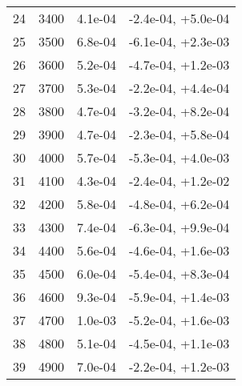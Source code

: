 \begin{table}
\begin{adjustbox}{width=1\textwidth/2}
\begin{tabular}{|c|c|c|c|}
\cline{1-4}
24 & 3400 & 4.1e-04 & -2.4e-04, +5.0e-04 \\
\cline{1-4}
25 & 3500 & 6.8e-04 & -6.1e-04, +2.3e-03 \\
\cline{1-4}
26 & 3600 & 5.2e-04 & -4.7e-04, +1.2e-03 \\
\cline{1-4}
27 & 3700 & 5.3e-04 & -2.2e-04, +4.4e-04 \\
\cline{1-4}
28 & 3800 & 4.7e-04 & -3.2e-04, +8.2e-04 \\
\cline{1-4}
29 & 3900 & 4.7e-04 & -2.3e-04, +5.8e-04 \\
\cline{1-4}
30 & 4000 & 5.7e-04 & -5.3e-04, +4.0e-03 \\
\cline{1-4}
31 & 4100 & 4.3e-04 & -2.4e-04, +1.2e-02 \\
\cline{1-4}
32 & 4200 & 5.8e-04 & -4.8e-04, +6.2e-04 \\
\cline{1-4}
33 & 4300 & 7.4e-04 & -6.3e-04, +9.9e-04 \\
\cline{1-4}
34 & 4400 & 5.6e-04 & -4.6e-04, +1.6e-03 \\
\cline{1-4}
35 & 4500 & 6.0e-04 & -5.4e-04, +8.3e-04 \\
\cline{1-4}
36 & 4600 & 9.3e-04 & -5.9e-04, +1.4e-03 \\
\cline{1-4}
37 & 4700 & 1.0e-03 & -5.2e-04, +1.6e-03 \\
\cline{1-4}
38 & 4800 & 5.1e-04 & -4.5e-04, +1.1e-03 \\
\cline{1-4}
39 & 4900 & 7.0e-04 & -2.2e-04, +1.2e-03 \\
\cline{1-4}
\end{tabular}
\end{adjustbox}
\end{table}

